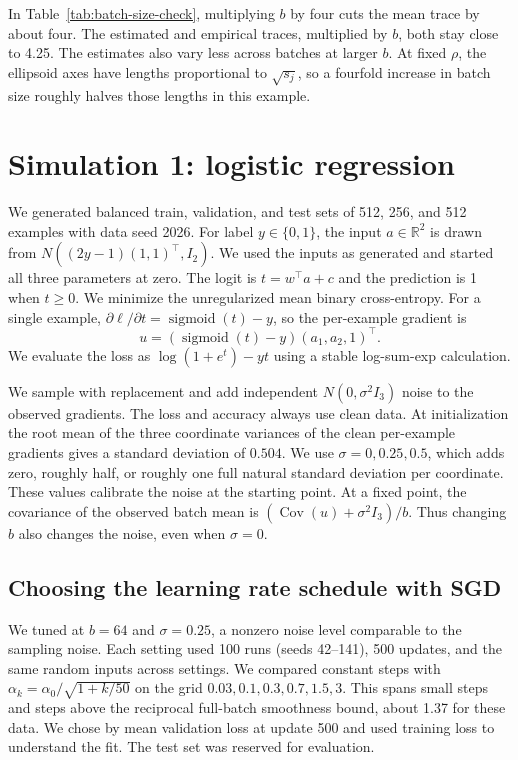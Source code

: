 \documentclass[11pt,a4paper]{article}
\begin{document}
In Table~\ref{tab:batch-size-check}, multiplying $b$ by four cuts the
mean trace by about four. The estimated and empirical traces, multiplied
by $b$, both stay close to 4.25. The estimates also vary less across
batches at larger $b$. At fixed $\rho$, the ellipsoid axes have lengths
proportional to $\sqrt{s_j}$, so a fourfold increase in batch size
roughly halves those lengths in this example.

\section{Simulation 1: logistic regression}
\label{sec:logistic}

We generated balanced train, validation, and test sets of 512, 256, and
512 examples with data seed 2026. For label $y\in\{0,1\}$, the input
$a\in\mathbb{R}^2$ is drawn from
$N((2y-1)(1,1)^\top,I_2)$. We used the inputs as generated and started
all three parameters at zero. The logit is $t=w^\top a+c$ and the
prediction is 1 when $t\geq 0$. We minimize the unregularized mean
binary cross-entropy. For a single example, $\partial\ell/\partial t
=\operatorname{sigmoid}(t)-y$, so the per-example gradient is
\[
    u=(\operatorname{sigmoid}(t)-y)(a_1,a_2,1)^\top .
\]
We evaluate the loss as $\log(1+e^t)-yt$ using a stable
log-sum-exp calculation.

We sample with replacement and add independent $N(0,\sigma^2 I_3)$
noise to the observed gradients. The loss and accuracy always use
clean data. At initialization the root mean of the three coordinate
variances of the clean per-example gradients gives a standard
deviation of $0.504$. We use $\sigma=0,0.25,0.5$, which adds zero,
roughly half, or roughly one full natural standard deviation per
coordinate. These values calibrate the noise at the starting point.
At a fixed point, the covariance of the observed batch mean is
$(\operatorname{Cov}(u)+\sigma^2 I_3)/b$. Thus changing $b$ also changes
the noise, even when $\sigma=0$.

\clearpage

\subsection*{Choosing the learning rate schedule with SGD}

We tuned at $b=64$ and $\sigma=0.25$, a nonzero noise level comparable
to the sampling noise. Each setting used 100 runs (seeds 42--141),
500 updates, and the same random inputs across settings. We compared
constant steps with $\alpha_k=\alpha_0/\sqrt{1+k/50}$ on the grid
$0.03,0.1,0.3,0.7,1.5,3$. This spans small steps and steps above
the reciprocal full-batch smoothness bound, about 1.37 for these data.
We chose by mean validation loss at update 500 and used training loss
to understand the fit. The test set was reserved for evaluation.
\end{document}
